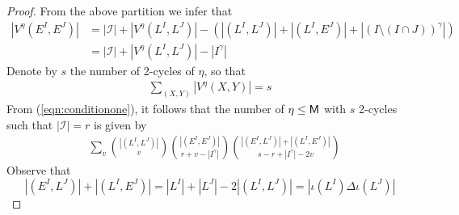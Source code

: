 \documentclass[11pt, a4paper, oneside, reqno]{amsart}
\theoremstyle{remark}
\theoremstyle{definition}
\numberwithin{equation}{section}
\begin{document}
\begin{proof}
	From the above partition we infer that
	\begin{align}
		\label{eqn:conditionone}
		 |V^{\eta}(E^I,E^J
        )|
		&= |\mathcal{I}| + |V^{\eta}(L^I,L^J)| \nonumber
		                                    -  (|(L^I,L^J)| + |(L^I,E^J)| + |(I\setminus (I\cap J))^\gamma|)                                        \nonumber \\
		                                   & = |\mathcal{I}| + |V^{\eta}(L^I,L^J)|-|I^\gamma|
	\end{align}
    Denote by $s$ the number of 2-cycles of $\eta$, so that
	\begin{align}
		\label{eqn:conditiontwo}
		\sum_{(X,Y)}|V^{\eta}(X,Y) | = s
	\end{align}
	From (\ref{eqn:conditionone}), it follows that the number of $\eta \leq {\sf M}$ with $s$ 2-cycles such that $|\mathcal{I}|=r$ is given by
	\begin{align}
	\label{eqn:CountingEta}
			 & \sum_v\binom{|(L^I,L^J)|}{v}
			 \binom{|(E^I, E^J)|}{r + v-|I^{\gamma}|} \binom{|(E^I,L^J)|+|(L^I,E^J)|}{s-r+|I^\gamma|-2v}
	\end{align}
    Observe that
    \begin{equation}
    \label{eqn:SymDiffEquality}
          |(E^I,L^J)| + |(L^I,E^J)| = |L^I|+ |L^J| -2|(L^I,L^J)|= |\iota(L^I)\Delta \iota (L^J)|
    \end{equation}
    

\end{proof}
\end{document}
